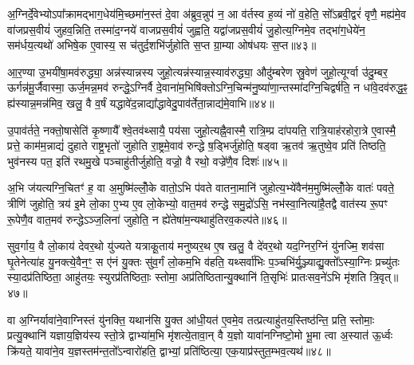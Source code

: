 {\anuvakamend[{वि वै य॒ज्ञः साम॑ च म॒ इत्या॑ह च ति॒स्रश्चैका॒न्नप॑ञ्चा॒शच्च॑॥८॥}]}

अ॒ग्निर्दे॒वेभ्यो\-ऽपा᳚क्रामद्भाग॒धेय॑मि॒च्छमा॑न॒स्तं दे॒वा अ॑ब्रुव॒न्नुप॑ न॒ आ व॑र्तस्व ह॒व्यं नो॑ व॒हेति॒ सो᳚\-ऽब्रवी॒द्वरं॑ वृणै॒ मह्य॑मे॒व वा॑जप्रस॒वीयं॑ जुहव॒न्निति॒ तस्मा॑द॒ग्नये॑ वाजप्रस॒वीयं॑ जुह्वति॒ यद्वा॑जप्रस॒वीयं॑ जु॒होत्य॒ग्निमे॒व तद्भा॑ग॒धेये॑न॒ सम॑र्धय॒त्यथो॑ अभिषे॒क ए॒वास्य॒ स च॑तुर्द॒शभि॑र्जुहोति स॒प्त ग्रा॒म्या ओष॑धयः स॒प्त॥४३॥

आ॒र॒ण्या उ॒भयी॑षा॒मव॑रुद्ध्या॒ अन्न॑स्यान्नस्य जुहो॒त्यन्न॑स्यान्न॒स्याव॑रुद्ध्या॒ औदु॑म्बरेण स्रु॒वेण॑ जुहो॒त्यूर्ग्वा उ॑दु॒म्बर॒ ऊर्गन्न॑मू॒र्जैवास्मा॒ ऊर्ज॒मन्न॒मव॑ रुन्द्धे॒\-ऽग्निर्वै दे॒वाना॑म॒भिषि॑क्तो\-ऽग्नि॒चिन्म॑नु॒ष्या॑णा॒न्तस्मा॑दग्नि॒चिद्वर्\mbox{}ष॑ति॒ न धा॑वे॒दव॑रुद्ध॒ꣴ॒ ह्य॑स्यान्न॒मन्न॑मिव॒ खलु॒ वै व॒र्\mbox{}षं यद्धावे॑द॒न्नाद्या᳚द्धावेदु॒पाव॑र्तेता॒न्नाद्य॑मे॒वाभि॥४४॥

उ॒पाव॑र्तते॒ नक्तो॒षासेति॑ कृ॒ष्णायै᳚ श्वे॒तव॑थ्सायै॒ पय॑सा जुहो॒त्यह्नै॒वास्मै॒ रात्रि॒म्प्र दा॑पयति॒ रात्रि॒याह॑रहोरा॒त्रे ए॒वास्मै॒ प्रत्ते॒ काम॑म॒न्नाद्यं॑ दुहाते राष्ट्र॒भृतो॑ जुहोति रा॒ष्ट्रमे॒वाव॑ रुन्द्धे ष॒ड्भिर्जु॑होति॒ षड्वा ऋ॒तव॑ ऋ॒तुष्वे॒व प्रति॑ तिष्ठति॒ भुव॑नस्य पत॒ इति॑ रथमु॒खे पञ्चाहु॑तीर्जुहोति॒ वज्रो॒ वै रथो॒ वज्रे॑णै॒व दिशः॑॥४५॥

अ॒भि ज॑यत्यग्नि॒चितꣳ॑ ह॒ वा अ॒मुष्मि॑ल्लोँ॒के वातो॒\-ऽभि प॑वते वातना॒मानि॑ जुहोत्य॒भ्ये॑वैन॑म॒मुष्मि॑ल्लोँ॒के वातः॑ पवते॒ त्रीणि॑ जुहोति॒ त्रय॑ इ॒मे लो॒का ए॒भ्य ए॒व लो॒केभ्यो॒ वात॒मव॑ रुन्द्धे समु॒द्रो॑\-ऽसि॒ नभ॑स्वा॒नित्या॑है॒तद्वै वात॑स्य रू॒पꣳ रू॒पेणै॒व वात॒मव॑ रुन्द्धे\-ऽञ्ज॒लिना॑ जुहोति॒ न ह्ये॑तेषा॑म॒न्यथाहु॑तिरव॒कल्प॑ते॥४६॥

{\anuvakamend[{ओष॑धयः स॒प्ताभि दिशो॒\-ऽन्यथा॒ द्वे च॑॥९॥}]}

सुव॒र्गाय॒ वै लो॒काय॑ देवर॒थो यु॑ज्यते यत्राकू॒ताय॑ मनुष्यर॒थ ए॒ष खलु॒ वै दे॑वर॒थो यद॒ग्निर॒ग्निं यु॑नज्मि॒ शव॑सा घृ॒तेनेत्या॑ह यु॒नक्त्ये॒वैन॒ꣳ॒ स ए॑नं यु॒क्तः सु॑व॒र्गं लो॒कम॒भि व॑हति॒ यथ्सर्वा॑भिः प॒ञ्चभि॑र्यु॒ञ्ज्याद्यु॒क्तो᳚\-ऽस्या॒ग्निः प्रच्यु॑तः स्या॒दप्र॑तिष्ठिता॒ आहु॑तयः॒ स्युरप्र॑तिष्ठिताः॒ स्तोमा॒ अप्र॑तिष्ठितान्यु॒क्थानि॑ ति॒सृभिः॑ प्रातःसव॒ने॑\-ऽभि मृ॑शति त्रि॒वृत्॥४७॥

वा अ॒ग्निर्यावा॑ने॒वाग्निस्तं यु॑नक्ति॒ यथान॑सि यु॒क्त आ॑धी॒यत॑ ए॒वमे॒व तत्प्रत्याहु॑तय॒स्तिष्ठ॑न्ति॒ प्रति॒ स्तोमाः॒ प्रत्यु॒क्थानि॑ यज्ञाय॒ज्ञिय॑स्य स्तो॒त्रे द्वाभ्या॑म॒भि मृ॑शत्ये॒तावा॒न् वै य॒ज्ञो यावा॑नग्निष्टो॒मो भू॒मा त्वा अ॒स्यात॑ ऊ॒र्ध्वः क्रि॑यते॒ यावा॑ने॒व य॒ज्ञस्तम॑न्त॒तो᳚\-ऽन्वारो॑हति॒ द्वाभ्यां॒ प्रति॑ष्ठित्या॒ एक॒याप्र॑स्तुत॒म्भव॒त्यथ॑॥४८॥

